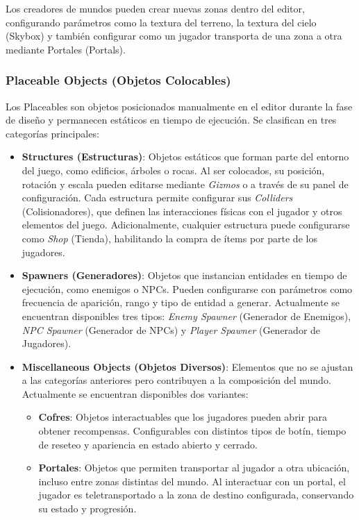 Los creadores de mundos pueden crear nuevas zonas dentro del editor, configurando parámetros como la textura
del terreno, la textura del cielo (Skybox) y también configurar como un jugador transporta de una zona a otra mediante
Portales (Portals).

\subsubsection{Placeable Objects (Objetos Colocables)}

Los Placeables son objetos posicionados manualmente en el editor durante la fase de diseño y permanecen estáticos en 
tiempo de ejecución. Se clasifican en tres categorías principales:

\begin{itemize}
  \item \textbf{Structures (Estructuras)}: Objetos estáticos que forman parte del entorno del juego, como edificios, 
  árboles o rocas. Al ser colocados, su posición, rotación y escala pueden editarse mediante \textit{Gizmos} o a través 
  de su panel de configuración. Cada estructura permite configurar sus \textit{Colliders} (Colisionadores), que definen 
  las interacciones físicas con el jugador y otros elementos del juego. Adicionalmente, cualquier estructura puede 
  configurarse como \textit{Shop} (Tienda), habilitando la compra de ítems por parte de los jugadores.

  \item \textbf{Spawners (Generadores)}: Objetos que instancian entidades en tiempo de ejecución, como enemigos o NPCs. 
  Pueden configurarse con parámetros como frecuencia de aparición, rango y tipo de entidad a generar. Actualmente se 
  encuentran disponibles tres tipos: \textit{Enemy Spawner} (Generador de Enemigos), \textit{NPC Spawner} (Generador 
  de NPCs) y \textit{Player Spawner} (Generador de Jugadores).

\item \textbf{Miscellaneous Objects (Objetos Diversos)}: Elementos que no se ajustan a las categorías anteriores pero 
  contribuyen a la composición del mundo. Actualmente se encuentran disponibles dos variantes:
  \begin{itemize}
    \item \textbf{Cofres}: Objetos interactuables que los jugadores pueden abrir para obtener recompensas.
    Configurables con distintos tipos de botín, tiempo de reseteo y apariencia en estado abierto y cerrado.
    \item \textbf{Portales}: Objetos que permiten transportar al jugador a otra ubicación, incluso entre zonas distintas 
    del mundo. Al interactuar con un portal, el jugador es teletransportado a la zona de destino configurada,
    conservando su estado y progresión.
  \end{itemize}
\end{itemize}

